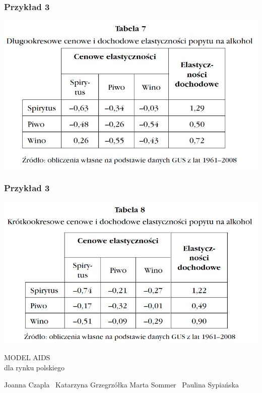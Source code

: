 \documentclass[11pt,usenames,dvipsnames,svgnames,x11names]{beamer}\usepackage[]{graphicx}\usepackage[]{color}
\theoremstyle{definition}
\theoremstyle{remark}
\begin{document}
\begin{frame}
\begin{center}
\frametitle{Przykład 3}
\includegraphics[scale=0.5]{k1.jpg}
\end{center}
\end{frame}

\begin{frame}
\frametitle{Przykład 3}
\includegraphics[scale=0.5]{k2.jpg}
\end{frame}




\begin{frame}
\begin{center}
\Huge{MODEL AIDS \\ dla rynku polskiego}

\medskip
\medskip
\medskip

\LARGE{Joanna Czapla \ Katarzyna Grzegrzółka \newline Marta Sommer \ Paulina Sypiańska}
\end{center}
\end{frame}
\end{document}
